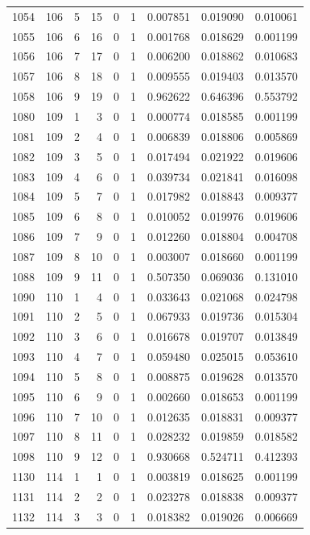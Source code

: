 \begin{longtable}{rrrrrrrrr}
1054 & 106 & 5 & 15 & 0 & 1 & 0.007851 & 0.019090 & 0.010061 \\
1055 & 106 & 6 & 16 & 0 & 1 & 0.001768 & 0.018629 & 0.001199 \\
1056 & 106 & 7 & 17 & 0 & 1 & 0.006200 & 0.018862 & 0.010683 \\
1057 & 106 & 8 & 18 & 0 & 1 & 0.009555 & 0.019403 & 0.013570 \\
1058 & 106 & 9 & 19 & 0 & 1 & 0.962622 & 0.646396 & 0.553792 \\
1080 & 109 & 1 & 3 & 0 & 1 & 0.000774 & 0.018585 & 0.001199 \\
1081 & 109 & 2 & 4 & 0 & 1 & 0.006839 & 0.018806 & 0.005869 \\
1082 & 109 & 3 & 5 & 0 & 1 & 0.017494 & 0.021922 & 0.019606 \\
1083 & 109 & 4 & 6 & 0 & 1 & 0.039734 & 0.021841 & 0.016098 \\
1084 & 109 & 5 & 7 & 0 & 1 & 0.017982 & 0.018843 & 0.009377 \\
1085 & 109 & 6 & 8 & 0 & 1 & 0.010052 & 0.019976 & 0.019606 \\
1086 & 109 & 7 & 9 & 0 & 1 & 0.012260 & 0.018804 & 0.004708 \\
1087 & 109 & 8 & 10 & 0 & 1 & 0.003007 & 0.018660 & 0.001199 \\
1088 & 109 & 9 & 11 & 0 & 1 & 0.507350 & 0.069036 & 0.131010 \\
1090 & 110 & 1 & 4 & 0 & 1 & 0.033643 & 0.021068 & 0.024798 \\
1091 & 110 & 2 & 5 & 0 & 1 & 0.067933 & 0.019736 & 0.015304 \\
1092 & 110 & 3 & 6 & 0 & 1 & 0.016678 & 0.019707 & 0.013849 \\
1093 & 110 & 4 & 7 & 0 & 1 & 0.059480 & 0.025015 & 0.053610 \\
1094 & 110 & 5 & 8 & 0 & 1 & 0.008875 & 0.019628 & 0.013570 \\
1095 & 110 & 6 & 9 & 0 & 1 & 0.002660 & 0.018653 & 0.001199 \\
1096 & 110 & 7 & 10 & 0 & 1 & 0.012635 & 0.018831 & 0.009377 \\
1097 & 110 & 8 & 11 & 0 & 1 & 0.028232 & 0.019859 & 0.018582 \\
1098 & 110 & 9 & 12 & 0 & 1 & 0.930668 & 0.524711 & 0.412393 \\
1130 & 114 & 1 & 1 & 0 & 1 & 0.003819 & 0.018625 & 0.001199 \\
1131 & 114 & 2 & 2 & 0 & 1 & 0.023278 & 0.018838 & 0.009377 \\
1132 & 114 & 3 & 3 & 0 & 1 & 0.018382 & 0.019026 & 0.006669 \\

\end{longtable}
